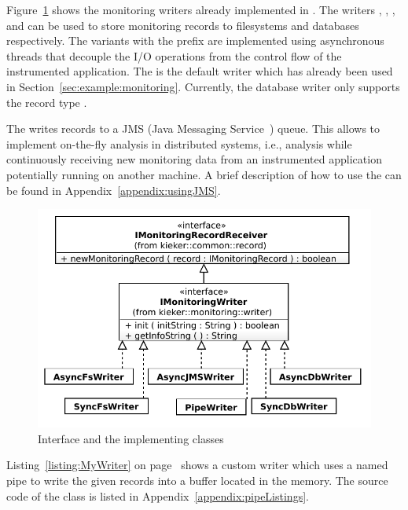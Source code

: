 Figure~\ref{figure:monitoringLogWritersHierarchy} shows the monitoring writers %
already implemented in \KiekerMonitoringPart{}. The writers , %
, , and  can be used %
to store monitoring records to filesystems and databases respectively. %
The variants with the prefix  are implemented using asynchronous %
threads that decouple the I/O operations from the control flow of the %
instrumented application. %
The  is the default writer which has already been used in %
Section~\ref{sec:example:monitoring}. %
Currently, the database writer only supports the record type . %

The  writes records to a JMS (Java Messaging Service~\cite{JMS-WebSite}) queue. %
This allows to implement on-the-fly analysis in distributed systems, i.e., analysis while %
continuously receiving new monitoring data from an instrumented application potentially %
running on another machine. A brief description of how to use the  %
can be found in Appendix~\ref{appendix:usingJMS}. %

\begin{figure}[H]
\begin{centering}
\includegraphics[scale=0.7]{images/kieker_writerimplsuserguide-modified}
\caption{Interface  and  the implementing classes}
\label{figure:monitoringLogWritersHierarchy}
\end{centering}
\end{figure}

\noindent Listing~\ref{listing:MyWriter} on page~\pageref{listing:MyWriter} shows %
a custom writer  which uses a named pipe to %
write the given records into a buffer located in the memory. The source code of %
the class  is listed in Appendix~\ref{appendix:pipeListings}. %

